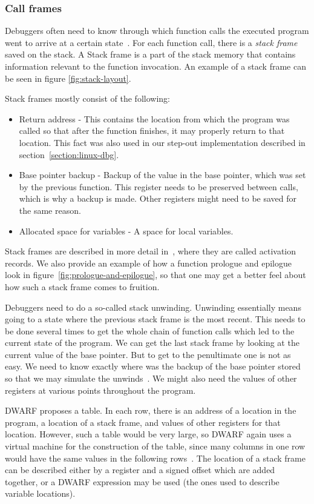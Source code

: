 \subsubsection{Call frames}\label{section:call-frames}
Debuggers often need to know through which function calls the executed program
went to arrive at a certain state~\cite{dwarf}. For each function call, there
is a \textit{stack frame} saved on the stack. A Stack frame is a part of the
stack memory that contains information relevant to the function invocation. An
example of a stack frame can be seen in figure \ref{fig:stack-layout}.

Stack frames mostly consist of the following:
\begin{itemize}
    \item Return address - This contains the location from which the program
        was called so that after the function finishes, it may properly return
        to that location. This fact was also used in our step-out
        implementation described in section~\ref{section:linux-dbg}.
    \item Base pointer backup - Backup of the value in the base pointer, which
        was set by the previous function. This register needs to be preserved
        between calls, which is why a backup is made. Other registers might need
        to be saved for the same reason.
    \item Allocated space for variables - A space for local variables.
\end{itemize}
Stack frames are described in more detail in~\cite{dragon-book}, where they are
called activation records. We also provide an example of how a function
prologue and epilogue look in figure~\ref{fig:prologue-and-epilogue}, so that
one may get a better feel about how such a stack frame comes to fruition.

Debuggers need to do a so-called stack unwinding. Unwinding essentially means
going to a state where the previous stack frame is the most recent. This needs
to be done several times to get the whole chain of function calls which led to
the current state of the program. We can get the last stack frame by looking at
the current value of the base pointer. But to get to the penultimate one is not
as easy. We need to know exactly where was the backup of the base pointer
stored so that we may simulate the unwinds~\cite{dwarf}. We might also need the
values of other registers at various points throughout the program.

DWARF proposes a table. In each row, there is an address of a location in the
program, a location of a stack frame, and values of other registers for that
location. However, such a table would be very large, so DWARF again uses a
virtual machine for the construction of the table, since many columns in one
row would have the same values in the following rows~\cite{dwarf}. The location
of a stack frame can be described either by a register and a signed offset
which are added together, or a DWARF expression may be used (the ones used to
describe variable locations).

